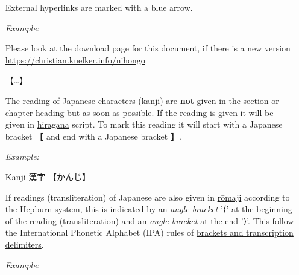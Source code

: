 \begin{itemize}

    \item[\Link]

        External hyperlinks are marked with a blue arrow.

        \medskip \textit{Example:} \medskip

        \begin{center}

            Please look at the download page for this document, if there is a
            new version\\ \Link
            \href{https://christian.kuelker.info/nihongo}{https://christian.kuelker.info/nihongo}

        \end{center}

    \item[{【}\ldots{】}]

        The reading of Japanese characters (\hyperref[sec:Kanji]{kanji}) are
        \textbf{not} given in the section or chapter heading but as soon as
        possible.  If the reading is given it will be given in
        \hyperref[sec:Hiragana]{hiragana} script. To mark this reading it will
        start with a Japanese bracket {【} and end with a Japanese bracket
        {】}.

        \medskip \textit{Example:} \medskip

        \begin{center} \Large Kanji {漢字} {【かんじ】} \end{center}

        \medskip

    \item[\jtl{\ldots}]

         If readings (transliteration) of Japanese are also given in
         \hyperref[sec:Romaji]{rōmaji} according to the
         \hyperref[sec:Hepburn]{Hepburn system}, this is indicated by an
         \textit{angle bracket} '⟨' at
         the beginning of the reading (transliteration) and an \textit{angle
         bracket} at the end '⟩'. This
         follow the International Phonetic Alphabet (IPA) rules of \Link
         \href{https://en.wikipedia.org/wiki/International_Phonetic_Alphabet#Brackets_and_transcription_delimiters}{brackets
         and transcription delimiters}.

        \medskip \textit{Example:} \medskip 


\end{itemize}
